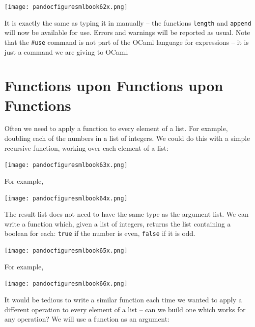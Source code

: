 \documentclass[]{book}
\begin{document}
\medskip
\begin{center}
\noindent\texttt{[image: pandocfiguresmlbook62x.png]}
\end{center}
\medskip

\noindent {}It is exactly the same as typing it in manually -- the functions \texttt{length} and \texttt{append} will now be available for use. Errors and warnings will be reported as usual. Note that the \texttt{\#use} command is not part of the OCaml language for expressions -- it is just a command we are giving to OCaml.

\chapter[Functions upon Functions upon Functions]{Functions upon Functions upon Functions}
\pagestyle{fancy}
Often we need to apply a function to every element of a list. For example, doubling each of the numbers in a list of integers. We could do this with a simple recursive function, working over each element of a list:

\medskip
\begin{center}
\noindent\texttt{[image: pandocfiguresmlbook63x.png]}
\end{center}
\medskip

\noindent For example,

\medskip
\begin{center}
\noindent\texttt{[image: pandocfiguresmlbook64x.png]}
\end{center}
\medskip

\noindent The result list does not need to have the same type as the argument list. We can write a function which, given a list of integers, returns the list containing a boolean for each: \texttt{true} if the number is even, \texttt{false} if it is odd.

\medskip
\begin{center}
\noindent\texttt{[image: pandocfiguresmlbook65x.png]}
\end{center}
\medskip

\noindent For example,

\medskip
\begin{center}
\noindent\texttt{[image: pandocfiguresmlbook66x.png]}
\end{center}
\medskip

\noindent It would be tedious to write a similar function each time we wanted to apply a different operation to every element of a list -- can we build one which works for any operation? We will use a function as an argument:
\end{document}
